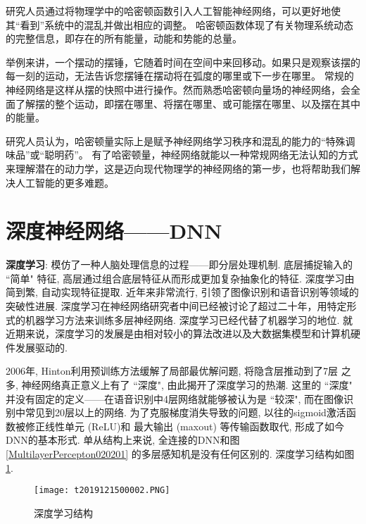 研究人员通过将物理学中的哈密顿函数引入人工智能神经网络，可以更好地使其“看到”系统中的混乱并做出相应的调整。
哈密顿函数体现了有关物理系统动态的完整信息，即存在的所有能量，动能和势能的总量。

举例来讲，一个摆动的摆锤，它随着时间在空间中来回移动。如果只是观察该摆的每一刻的运动，无法告诉您摆锤在摆动将在弧度的哪里或下一步在哪里。
常规的神经网络是这样从摆的快照中进行操作。然而熟悉哈密顿向量场的神经网络，会全面了解摆的整个运动，即摆在哪里、将摆在哪里、或可能摆在哪里、以及摆在其中的能量。

研究人员认为，哈密顿量实际上是赋予神经网络学习秩序和混乱的能力的“特殊调味品”或“聪明药”。
有了哈密顿量，神经网络就能以一种常规网络无法认知的方式来理解潜在的动力学，这是迈向现代物理学的神经网络的第一步，也将帮助我们解决人工智能的更多难题。
\section{深度神经网络——DNN}

\textbf{深度学习}: 模仿了一种人脑处理信息的过程——即分层处理机制.
底层捕捉输入的 “简单" 特征, 高层通过组合底层特征从而形成更加复杂抽象化的特征.
深度学习由简到繁, 自动实现特征提取.
近年来非常流行, 引领了图像识别和语音识别等领域的突破性进展.
深度学习在神经网络研究者中间已经被讨论了超过二十年，用特定形式的机器学习方法来训练多层神经网络.
深度学习已经代替了机器学习的地位.
就近期来说，深度学习的发展是由相对较小的算法改进以及大数据集模型和计算机硬件发展驱动的.

2006年, Hinton利用预训练方法缓解了局部最优解问题, 将隐含层推动到了7层 \cite{Hinton2006-9587}之多, 神经网络真正意义上有了 ``深度", 由此揭开了深度学习的热潮.
这里的 ``深度" 并没有固定的定义——在语音识别中4层网络就能够被认为是 ``较深", 而在图像识别中常见到20层以上的网络.
为了克服梯度消失导致的问题, 以往的sigmoid激活函数被修正线性单元 (ReLU)和 最大输出 (maxout) 等传输函数取代, 形成了如今DNN的基本形式.
单从结构上来说, 全连接的DNN和图 \ref{MultilayerPercepton020201} 的多层感知机是没有任何区别的.
深度学习结构如图 \ref{AI32fig2019121502}.
\begin{figure}[H]
    \centering
    \texttt{[image: t2019121500002.PNG]}
    \caption{深度学习结构}
    \label{AI32fig2019121502}
\end{figure}
